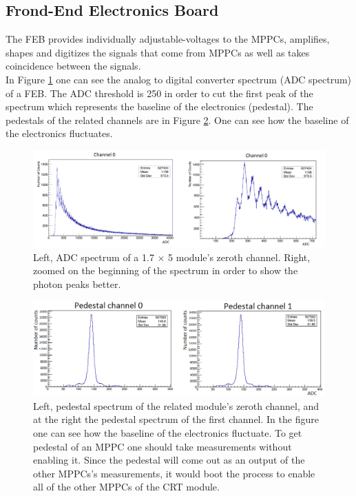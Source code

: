 \documentclass[a4paper]{article}\linespread{1.4}
\begin{document}
\subsection{Frond-End Electronics Board}
The FEB provides individually adjustable-voltages to the MPPCs, amplifies, shapes and digitizes the signals that come from MPPCs as well as takes coincidence between the signals. 
\\In Figure \ref{fig:cp} one can see the analog to digital converter spectrum (ADC spectrum) of a FEB. The ADC threshold is 250 in order to cut the first peak of the spectrum which represents the baseline of the electronics (pedestal). The pedestals of the related channels are in Figure \ref{fig:pd}. One can see how the baseline of the electronics fluctuates.
\begin{figure}[h!] \centering \includegraphics[width=130mm,scale=1.0]{figures/cp.png} \caption{Left, ADC spectrum of a 1.7 $\times$ 5 module's zeroth channel. Right, zoomed on the beginning of the spectrum in order to show the photon peaks better. }\label{fig:cp} \end{figure}
\begin{figure}[h!] \centering \includegraphics[width=130mm,scale=1.0]{figures/pd.png} \caption{Left, pedestal spectrum of the related module's zeroth channel, and at the right the pedestal spectrum of the first channel. In the figure one can see how the baseline of the electronics fluctuate. To get pedestal of an MPPC one should take measurements without enabling it. Since the pedestal will come out as an output of the other MPPCs's measurements, it would boot the process to enable all of the other MPPCs of the CRT module.} \label{fig:pd}\end{figure}
\end{document}
